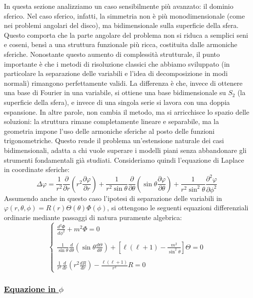 \documentclass[a4paper,12pt]{report}
\begin{document}
In questa sezione analizziamo un caso sensibilmente più avanzato: il dominio sferico. Nel caso sferico, infatti, la simmetria non è più monodimensionale (come nei problemi angolari del disco), ma bidimensionale sulla superficie della sfera. Questo comporta che la parte angolare del problema non si riduca a semplici seni e coseni, bensì a una struttura funzionale più ricca, costituita dalle armoniche sferiche. Nonostante questo aumento di complessità strutturale, il punto importante è che i metodi di risoluzione classici che abbiamo sviluppato  (in particolare la separazione delle variabili e l’idea di decomposizione in modi normali) rimangono perfettamente validi. La differenza è che, invece di ottenere una base di Fourier in una variabile, si ottiene una base bidimensionale su $S_2$ (la superficie della sfera), e invece di una singola serie si lavora con una doppia espansione. In altre parole, non cambia il metodo, ma si arricchisce lo spazio delle soluzioni: la struttura rimane completamente lineare e separabile, ma la geometria impone l’uso delle armoniche sferiche al posto delle funzioni trigonometriche. Questo rende il problema un’estensione naturale dei casi bidimensionali, adatta a chi vuole superare i modelli piani senza abbandonare gli strumenti fondamentali già studiati. Consideriamo quindi l'equazione di Laplace in coordinate sferiche:
\[
\Delta \varphi =
\frac{1}{r^2}\frac{\partial}{\partial r}\left(r^2 \frac{\partial \varphi}{\partial r}\right)
+
\frac{1}{r^2 \sin\theta}\frac{\partial}{\partial \theta}\left(\sin\theta \frac{\partial \varphi}{\partial \theta}\right)
+
\frac{1}{r^2 \sin^2\theta}\frac{\partial^2 \varphi}{\partial \phi^2}
\]
Assumendo anche in questo caso l'ipotesi di separazione delle variabili  in $\varphi(r,\theta,\phi)=R(r)\Theta(\theta)\Phi(\phi)$, si ottengono le seguenti equazioni differenziali ordinarie mediante passaggi di natura puramente algebrica:
\[\begin{cases}
\frac{d^2 \Phi}{d\phi^2} + m^2 \Phi = 0 \\
\\
\frac{1}{\sin\theta}\frac{d}{d\theta}\left(\sin\theta \frac{d\Theta}{d\theta}\right)
+ \left[\ell(\ell+1)-\frac{m^2}{\sin^2\theta}\right]\Theta = 0 \\
\\
\frac{1}{r^2}\frac{d}{dr}\left(r^2 \frac{dR}{dr}\right)
- \frac{\ell(\ell+1)}{r^2}R = 0
\end{cases}\]

\subsubsection{\underline{Equazione in $\phi$}}
\end{document}
